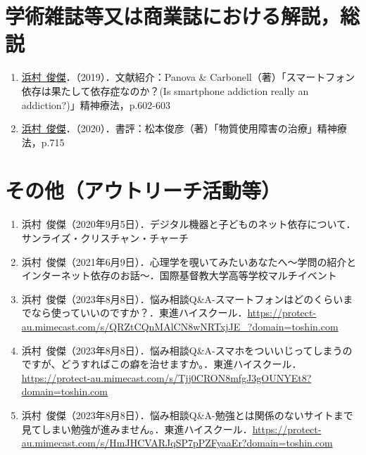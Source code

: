 \documentclass[11pt,a4paper]{article}
\begin{document}
\section{学術雑誌等又は商業誌における解説，総説}
\begin{enumerate}
	\item \underline{浜村\ 俊傑}．（2019）．文献紹介：Panova \& Carbonell（著）「スマートフォン依存は果たして依存症なのか？(Is smartphone addiction really an addiction?)」精神療法，p.602-603
	\item \underline{浜村\ 俊傑}．（2020）．書評：松本俊彦（著）「物質使用障害の治療」精神療法，p.715
\end{enumerate}

\section{その他（アウトリーチ活動等）}
\begin{enumerate}
	\item 浜村\ 俊傑（2020年9月5日）．デジタル機器と子どものネット依存について．サンライズ・クリスチャン・チャーチ
	\item 浜村\ 俊傑（2021年6月9日）．心理学を覗いてみたいあなたへ〜学問の紹介とインターネット依存のお話〜．国際基督教大学高等学校マルチイベント
	\item 浜村\ 俊傑（2023年8月8日）．悩み相談Q\&A-スマートフォンはどのくらいまでなら使っていいのですか？．東進ハイスクール．\url{https://protect-au.mimecast.com/s/QRZtCQnMAlCN8wNRTxjJE_?domain=toshin.com}
	\item 浜村\ 俊傑（2023年8月8日）．悩み相談Q\&A-スマホをついいじってしまうのですが、どうすればこの癖を治せますか。．東進ハイスクール．\url{https://protect-au.mimecast.com/s/Tjj0CRON8mfgJ3gOUNYEt8?domain=toshin.com}
	\item 浜村\ 俊傑（2023年8月8日）．悩み相談Q\&A-勉強とは関係のないサイトまで見てしまい勉強が進みません。．東進ハイスクール．\url{https://protect-au.mimecast.com/s/HmJHCVARJqSP7pPZFyaaEr?domain=toshin.com}
\end{enumerate}
\end{document}

